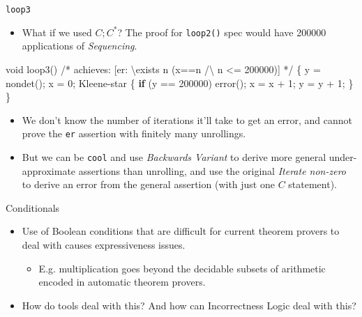 \documentclass[
  10pt,
  ignorenonframetext,
]{beamer}
\newenvironment{Shaded}{\begin{snugshade}}{\end{snugshade}}
\newcommand{\CommentTok}[1]{\textcolor[rgb]{0.48,0.49,0.49}{#1}}
\newcommand{\ControlFlowTok}[1]{\textcolor[rgb]{0.99,0.74,0.29}{\textbf{#1}}}
\newcommand{\DataTypeTok}[1]{\textcolor[rgb]{0.16,0.50,0.73}{#1}}
\newcommand{\DecValTok}[1]{\textcolor[rgb]{0.96,0.45,0.00}{#1}}
\newcommand{\NormalTok}[1]{\textcolor[rgb]{0.81,0.81,0.76}{#1}}
\newcommand{\OperatorTok}[1]{\textcolor[rgb]{0.81,0.81,0.76}{#1}}
\providecommand{\tightlist}{%
  \setlength{\itemsep}{0pt}\setlength{\parskip}{0pt}}
\begin{document}
\begin{frame}[fragile]{\texttt{loop3}}
\label{loop3}
\begin{itemize}
\tightlist
\item
  What if we used \(C ; C^{*}\)? The proof for \texttt{loop2()} spec
  would have 200000 applications of \emph{Sequencing}.
\end{itemize}

\begin{Shaded}
\begin{Highlighting}[]
\DataTypeTok{void}\NormalTok{ loop3}\OperatorTok{()}
\CommentTok{/* achieves: [er: \textbackslash{}exists n (x==n /\textbackslash{} n \textless{}= 200000)] */}
\OperatorTok{\{}\NormalTok{ y }\OperatorTok{=}\NormalTok{ nondet}\OperatorTok{();}
\NormalTok{  x }\OperatorTok{=} \DecValTok{0}\OperatorTok{;}
\NormalTok{  Kleene}\OperatorTok{{-}}\NormalTok{star }\OperatorTok{\{}
    \ControlFlowTok{if} \OperatorTok{(}\NormalTok{y }\OperatorTok{==} \DecValTok{200000}\OperatorTok{)}\NormalTok{ error}\OperatorTok{();} 
\NormalTok{    x }\OperatorTok{=}\NormalTok{ x }\OperatorTok{+} \DecValTok{1}\OperatorTok{;}
\NormalTok{    y }\OperatorTok{=}\NormalTok{ y }\OperatorTok{+} \DecValTok{1}\OperatorTok{;}
\OperatorTok{\}} \OperatorTok{\}}
\end{Highlighting}
\end{Shaded}

\pause

\begin{itemize}
\tightlist
\item
  We don't know the number of iterations it'll take to get an error, and
  cannot prove the \texttt{er} assertion with finitely many unrollings.
\end{itemize}

\pause

\begin{itemize}
\tightlist
\item
  But we can be \texttt{cool} and use \emph{Backwards Variant} to derive
  more general under-approximate assertions than unrolling, and use the
  original \emph{Iterate non-zero} to derive an error from the general
  assertion (with just one \(C\) statement).
\end{itemize}
\end{frame}

\begin{frame}{Conditionals}
\label{conditionals}
\begin{itemize}
\tightlist
\item
  Use of Boolean conditions that are difficult for current theorem
  provers to deal with causes expressiveness issues.

  \begin{itemize}
  \tightlist
  \item
    E.g. multiplication goes beyond the decidable subsets of arithmetic
    encoded in automatic theorem provers.
  \end{itemize}
\item
  How do tools deal with this? And how can Incorrectness Logic deal with
  this?
\end{itemize}
\end{frame}
\end{document}
